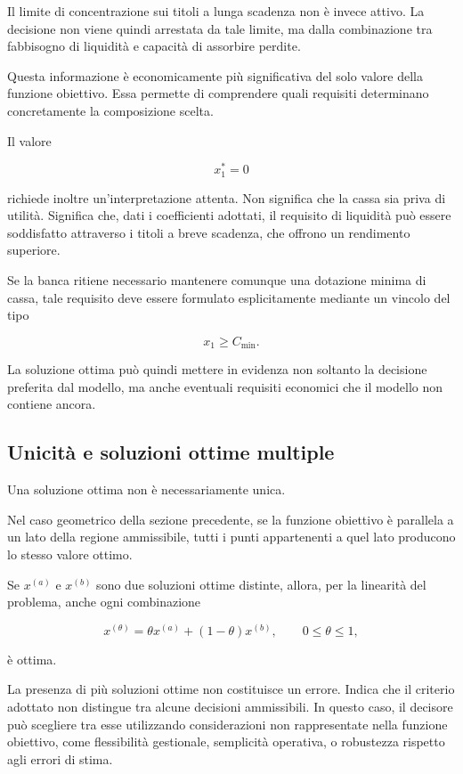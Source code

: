 Il limite di concentrazione sui titoli a lunga scadenza non \`e invece attivo.
La decisione non viene quindi arrestata da tale limite, ma dalla combinazione
tra fabbisogno di liquidit\`a e capacit\`a di assorbire perdite.

Questa informazione \`e economicamente pi\`u significativa del solo valore
della funzione obiettivo. Essa permette di comprendere quali requisiti
determinano concretamente la composizione scelta.

Il valore

\[
x_1^*=0
\]

\noindent richiede inoltre un'interpretazione attenta. Non significa che la cassa sia
priva di utilit\`a. Significa che, dati i coefficienti adottati, il requisito
di liquidit\`a pu\`o essere soddisfatto attraverso i titoli a breve scadenza,
che offrono un rendimento superiore.

Se la banca ritiene necessario mantenere comunque una dotazione minima di
cassa, tale requisito deve essere formulato esplicitamente mediante un vincolo
del tipo

\[
x_1\geq C_{\min}.
\]

La soluzione ottima pu\`o quindi mettere in evidenza non soltanto la decisione
preferita dal modello, ma anche eventuali requisiti economici che il modello
non contiene ancora.

\subsection{Unicit\`a e soluzioni ottime multiple}

Una soluzione ottima non \`e necessariamente unica.

Nel caso geometrico della sezione precedente, se la funzione obiettivo \`e
parallela a un lato della regione ammissibile, tutti i punti appartenenti a
quel lato producono lo stesso valore ottimo.

Se $x^{(a)}$ e $x^{(b)}$ sono due soluzioni ottime distinte, allora, per la
linearit\`a del problema, anche ogni combinazione

\[
x^{(\theta)}
=
\theta x^{(a)}
+
(1-\theta)x^{(b)},
\qquad
0\leq\theta\leq1,
\]

\noindent \`e ottima.

La presenza di pi\`u soluzioni ottime non costituisce un errore. Indica che il
criterio adottato non distingue tra alcune decisioni ammissibili. In questo
caso, il decisore pu\`o scegliere tra esse utilizzando considerazioni non
rappresentate nella funzione obiettivo, come flessibilit\`a gestionale,
semplicit\`a operativa, o robustezza rispetto agli errori di stima.

